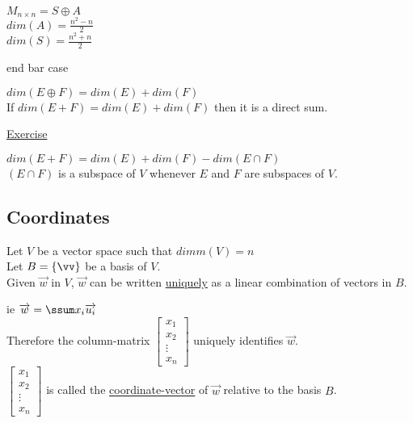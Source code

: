 \documentclass[12pt]{article}
\renewcommand{\v}[1]{\overrightarrow{#1}}
\newcommand\m[1]{\begin{bmatrix}#1\end{bmatrix}}
\newenvironment{block}[1][Label]{\underline{#1}\par}{}
\newcommand{\todo}[0]{\text{\textcolor{red}{\textbackslash\textbackslash TODO \ }}}
\newcommand{\bb}[1]{\left\{#1\right\}}
\begin{document}
$M_{n \times n} = S \oplus A$ \\
$dim(A) = \frac{n^2 - n}{2}$ \\
$dim(S) = \frac{n^2 + n}{2}$

\todo end bar case

$dim(E \oplus F) = dim(E) + dim(F)$ \\
If $dim(E + F) = dim(E) + dim(F)$ then it is a direct sum.

\begin{block}[Exercise]
$dim(E + F) = dim(E) + dim(F) - dim(E \cap F)$ \\
$(E \cap F)$ is a subspace of $V$ whenever $E$ and $F$ are subspaces of $V$.
\end{block}

\subsection{Coordinates}

Let $V$ be a vector space such that $dimm(V) = n$ \\
Let $B = \bb{\vv}$ be a basis of $V$. \\
Given $\v{w}$ in $V$, $\v{w}$ can be written \underline{uniquely} as a linear combination of vectors in $B$.

ie $\v{w} = \ssum x_i \v{u_i}$ \\

Therefore the column-matrix $\m{x_1 \\ x_2 \\ \vdots \\ x_n}$ uniquely identifies $\v{w}$. \\

$\m{x_1 \\ x_2 \\ \vdots \\ x_n}$ is called the \underline{coordinate-vector} of $\v{w}$ relative to the basis $B$.
\end{document}
